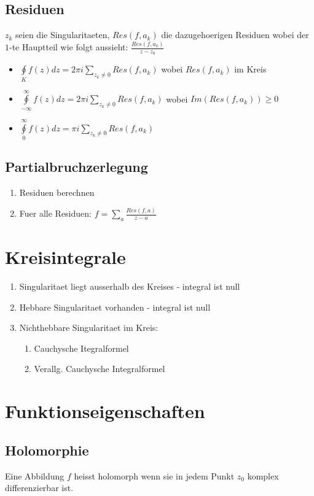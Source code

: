 \documentclass[10pt,a4paper]{article}
\begin{document}
\subsection{Residuen}
$z_k$ seien die Singularitaeten, $Res(f, a_k)$ die dazugehoerigen Residuen wobei der $1$-te Hauptteil wie folgt aussieht: $\frac{Res(f, a_k)}{z-z_0}$
\begin{itemize}
\item $\oint\limits_{K} f(z) dz = 2 \pi i \sum\limits_{z_k \neq 0} Res(f, a_k)$ wobei $Res(f, a_k)$ im Kreis
\item $\oint\limits_{-\infty}^{\infty} f(z) dz = 2 \pi i \sum\limits_{z_k \neq 0} Res(f, a_k)$ wobei $Im(Res(f, a_k)) \geq 0$
\item $\oint\limits_{0}^{\infty} f(z) dz = \pi i \sum\limits_{z_k \neq 0} Res(f, a_k)$
\end{itemize}

\subsection{Partialbruchzerlegung}
\begin{enumerate}
\item Residuen berechnen
\item Fuer alle Residuen: $f = \sum\limits_a \frac{Res(f, a)}{z-a}$
\end{enumerate}

\section{Kreisintegrale}
\begin{enumerate}
 \item Singularitaet liegt ausserhalb des Kreises - integral ist null
 \item Hebbare Singularitaet vorhanden - integral ist null
 \item Nichthebbare Singularitaet im Kreis:
 \begin{enumerate}
  \item Cauchysche Itegralformel
  \item Verallg. Cauchysche Integralformel
 \end{enumerate}
\end{enumerate}

\section{Funktionseigenschaften}
\subsection{Holomorphie}
Eine Abbildung $f$ heisst holomorph wenn sie in jedem Punkt $z_0$ komplex differenzierbar ist.
\end{document}
